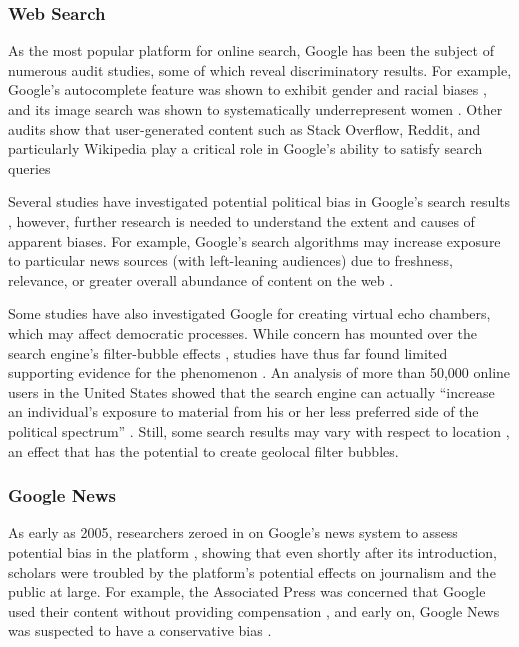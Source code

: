 \subsubsection{Web Search}
As the most popular platform for online search, Google has been the subject of numerous audit studies, some of which reveal discriminatory results. For example, Google's autocomplete feature was shown to exhibit gender and racial biases \citep{Baker2013}, and its image search was shown to systematically underrepresent women \citep{Kay}. Other audits show that user-generated content such as Stack Overflow, Reddit, and particularly Wikipedia play a critical role in Google's ability to satisfy search queries \cite{Vincent2019}

Several studies have investigated potential political bias in Google's search results \citep{Robertson2018,Diakopoulos,Epstein2017}, however, further research is needed to understand the extent and causes of apparent biases. For example, Google's search algorithms may increase exposure to particular news sources (with left-leaning audiences) due to freshness, relevance, or greater overall abundance of content on the web \citep{Trielli}.

Some studies have also investigated Google for creating virtual echo chambers, which may affect democratic processes. While concern has mounted over the search engine's filter-bubble effects \citep{Pariser}, studies have thus far found limited supporting evidence for the phenomenon \citep{Puschmann2018,Flaxman,Hannak2013,Robertson2018}. An analysis of more than 50,000 online users in the United States showed that the search engine can actually ``increase an individual's exposure to material from his or her less preferred side of the political spectrum'' \citep{Flaxman}. Still, some search results may vary with respect to location \citep{Kliman-Silver2015}, an effect that has the potential to create geolocal filter bubbles. %

\subsubsection{Google News}
As early as 2005, researchers zeroed in on Google's news system to assess potential bias in the platform \citep{Ulken2005,Schroeder2005}, showing that even shortly after its introduction, scholars were troubled by the platform's potential effects on journalism and the public at large. For example, the Associated Press was concerned that Google used their content without providing compensation \citep{Gaither2005}, and early on, Google News was suspected to have a conservative bias \citep{Ulken2005}.

